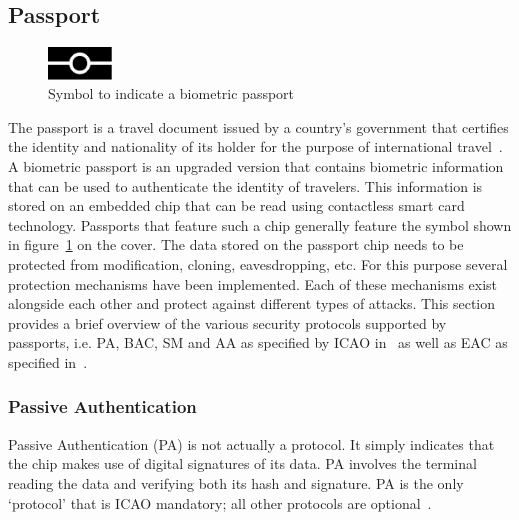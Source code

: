 \subsection{Passport}
\label{subsec:passports}
\begin{figure}
  \centering
	\includegraphics[width=0.15\textwidth]{images/biometrics_logo.pdf}
	\caption{Symbol to indicate a biometric passport}
	\label{fig:biometricslogo}
\end{figure}
The passport is a travel document issued by a country's government that certifies the identity and nationality of its holder for the purpose of international travel~\cite{passportdefinition}. A biometric passport is an upgraded version that contains biometric information that can be used to authenticate the identity of travelers. This information is stored on an embedded chip that can be read using contactless smart card technology. Passports that feature such a chip generally feature the symbol shown in figure~\ref{fig:biometricslogo} on the cover. The data stored on the passport chip needs to be protected from modification, cloning, eavesdropping, etc. For this purpose several protection mechanisms have been implemented. Each of these mechanisms exist alongside each other and protect against different types of attacks. This section provides a brief overview of the various security protocols supported by passports, i.e. PA, BAC, SM and AA as specified by ICAO in~\cite{icao} as well as EAC as specified in~\cite{bsi}. 

\subsubsection{Passive Authentication}
Passive Authentication (PA) is not actually a protocol. It simply indicates that the chip makes use of digital signatures of its data. PA involves the terminal reading the data and verifying both its hash and signature. PA is the only `protocol' that is ICAO mandatory; all other protocols are optional~\cite{mostowski2010electronic}.

